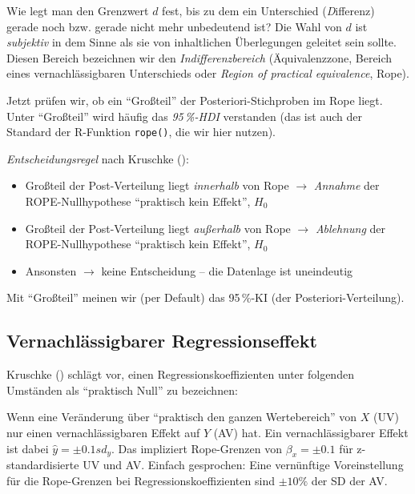 \documentclass[
  ngerman,
  letterpaper,
  twoside,
  open=any]{scrbook}
\providecommand{\tightlist}{%
  \setlength{\itemsep}{0pt}\setlength{\parskip}{0pt}}\usepackage{longtable,booktabs,array}
\theoremstyle{definition}
\theoremstyle{plain}
\theoremstyle{definition}
\theoremstyle{definition}
\theoremstyle{definition}
\theoremstyle{definition}
\theoremstyle{remark}
\begin{document}
Wie legt man den Grenzwert \(d\) fest, bis zu dem ein Unterschied
(\emph{D}ifferenz) gerade noch bzw. gerade nicht mehr unbedeutend ist?
Die Wahl von \(d\) ist \emph{subjektiv} in dem Sinne als sie von
inhaltlichen Überlegungen geleitet sein sollte. Diesen Bereich
bezeichnen wir den \emph{Indifferenzbereich} (Äquivalenzzone, Bereich
eines vernachlässigbaren Unterschieds oder \emph{Region of practical
equivalence}, Rope).

Jetzt prüfen wir, ob ein \enquote{Großteil} der Posteriori-Stichproben
im Rope liegt. Unter \enquote{Großteil} wird häufig das
\emph{95\,\%-HDI} verstanden (das ist auch der Standard der R-Funktion
\texttt{rope()}, die wir hier nutzen).

\emph{Entscheidungsregel} nach Kruschke
():

\begin{itemize}
\tightlist
\item
  Großteil der Post-Verteilung liegt \emph{innerhalb} von Rope
  \(\rightarrow\) \emph{Annahme} der ROPE-Nullhypothese
  \enquote{praktisch kein Effekt}, \(H_0\)
\item
  Großteil der Post-Verteilung liegt \emph{außerhalb} von Rope
  \(\rightarrow\) \emph{Ablehnung} der ROPE-Nullhypothese
  \enquote{praktisch kein Effekt}, \(H_0\)
\item
  Ansonsten \(\rightarrow\) keine Entscheidung -- die Datenlage ist
  uneindeutig
\end{itemize}

Mit \enquote{Großteil} meinen wir (per Default) das 95\,\%-KI (der
Posteriori-Verteilung).

\subsection{Vernachlässigbarer
Regressionseffekt}\label{vernachluxe4ssigbarer-regressionseffekt}

Kruschke () schlägt vor, einen
Regressionskoeffizienten unter folgenden Umständen als
\enquote{praktisch Null} zu bezeichnen:

Wenn eine Veränderung über \enquote{praktisch den ganzen Wertebereich}
von \(X\) (UV) nur einen vernachlässigbaren Effekt auf \(Y\) (AV) hat.
Ein vernachlässigbarer Effekt ist dabei \(\hat{y}= \pm 0.1 sd_y\). Das
impliziert Rope-Grenzen von \(\beta_x = \pm 0.1\) für z-standardisierte
UV und AV. Einfach gesprochen: Eine vernünftige Voreinstellung für die
Rope-Grenzen bei Regressionskoeffizienten sind \(\pm 10 \%\) der SD der
AV.
\end{document}

